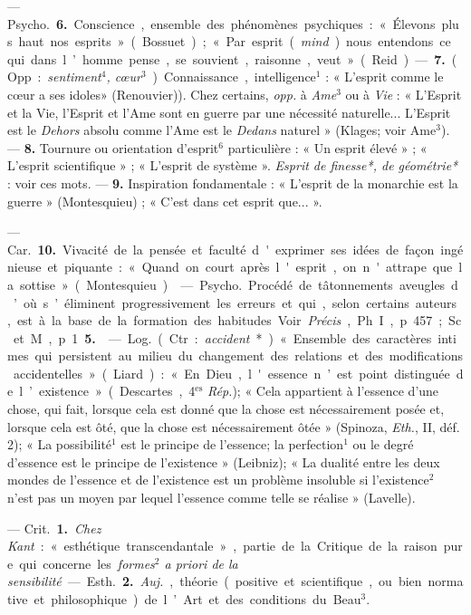 \begin{itemize}[leftmargin=1cm, label=, itemsep=1pt]
— \si{Psycho.} {\bf 6.} Conscience, ensemble des phénomènes psychiques :
« Élevons plus haut nos esprits »
(Bossuet); « Par esprit ({\it mind}) nous
entendons ce qui dans l’homme
pense, se souvient, raisonne, veut »
(Reid). — {\bf 7.} (Opp. : {\it sentiment$^4$,
cœur$^3$}). Connaissance, intelligence$^1$ :
« L'esprit comme le cœur a ses idoles»
(Renouvier)). Chez certains, {\it opp.} à
{\it Ame}$^3$ ou à {\it Vie} : « L'Esprit et la Vie,
l'Esprit et l'Ame sont en guerre par
une nécessité naturelle... L'Esprit
est le {\it Dehors} absolu comme l’Ame
est le {\it Dedans} naturel » (Klages;
voir Ame$^3$). — {\bf 8.} Tournure ou orientation d’esprit$^6$
particulière : « Un esprit élevé » ; « L'esprit scientifique » ;
« L'esprit de système ». {\it Esprit de finesse*, de géométrie*} :
voir ces mots. — {\bf 9.} Inspiration fondamentale : « L’esprit de la
monarchie est la guerre » (Montesquieu) ; « C’est dans cet esprit que... ».

— \si{Car.} {\bf 10.} Vivacité de la pensée
et faculté d'exprimer ses idées de
façon ingénieuse et piquante :
« Quand on court après l'esprit, on
n'attrape que la sottise » (Montesquieu).

 — \si{Psycho.} Procédé
de tâtonnements aveugles d’où s’éliminent progressivement les erreurs
et qui, selon certains auteurs, est à
la base de la formation des habitudes. Voir  {\it Précis}, Ph. I, p. 457; Sc.
et M., p. 1 {\bf 5.}

 — \si{Log.} (Ctr. : {\it accident}*).
« Ensemble des caractères intimes
qui persistent au milieu du changement des relations et des
modifications accidentelles » (Liard) : « En
Dieu, l'essence n’est point distinguée
de l’existence » (Descartes, 4$^\text{es}$ {\it Rép.});
« Cela appartient à l’essence d’une
chose, qui fait, lorsque cela est donné
que la chose est nécessairement
posée et, lorsque cela est ôté, que la
chose est nécessairement ôtée »
(Spinoza, {\it Eth.}, II, déf. 2); « La
possibilité$^1$ est le principe de l’essence; la perfection$^1$ ou le degré
d'essence est le principe de l'existence » (Leibniz); « La dualité entre
les deux mondes de l'essence et de
l'existence est un problème insoluble si l'existence$^2$ n’est pas un
moyen par lequel l'essence comme
telle se réalise » (Lavelle).

 — \si{Crit.} {\bf 1.} {\it Chez
Kant} : « esthétique transcendantale », partie de la Critique de la
raison pure qui concerne les {\it formes$^2$
a priori de la sensibilité}.

— \si{Esth.} {\bf 2.} {\it Auj.}, théorie (positive et scientifique, ou bien normative et philosophique) de l’Art et
des conditions du Beau$^3$.


\end{itemize}
